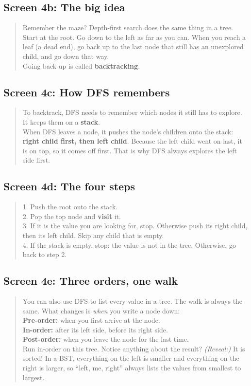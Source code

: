 \documentclass[11pt,a4paper]{article}
\begin{document}
\subsection*{Screen 4b: The big idea}
\begin{quote}\sffamily\small
Remember the maze? Depth-first search does the same thing in a tree.\\
Start at the root. Go down to the left as far as you can. When you reach a leaf (a dead end),
go back up to the last node that still has an unexplored child, and go down that way.\\[2pt]
Going back up is called \textbf{backtracking}.
\end{quote}

\subsection*{Screen 4c: How DFS remembers}
\begin{quote}\sffamily\small
To backtrack, DFS needs to remember which nodes it still has to explore. It keeps them on a
\textbf{stack}.\\
When DFS leaves a node, it pushes the node's children onto the stack: \textbf{right child first,
then left child}. Because the left child went on last, it is on top, so it comes off first. That is
why DFS always explores the left side first.
\end{quote}

\subsection*{Screen 4d: The four steps}
\begin{quote}\sffamily\small
1. Push the root onto the stack.\\
2. Pop the top node and \textbf{visit} it.\\
3. If it is the value you are looking for, stop. Otherwise push its right child, then its left
child. Skip any child that is empty.\\
4. If the stack is empty, stop: the value is not in the tree. Otherwise, go back to step 2.
\end{quote}

\subsection*{Screen 4e: Three orders, one walk}
\begin{quote}\sffamily\small
You can also use DFS to list every value in a tree. The walk is always the same. What changes is
\emph{when} you write a node down:\\
\textbf{Pre-order:} when you first arrive at the node.\\
\textbf{In-order:} after its left side, before its right side.\\
\textbf{Post-order:} when you leave the node for the last time.\\[2pt]
Run in-order on this tree. Notice anything about the result? \emph{(Reveal:)} It is sorted! In a BST,
everything on the left is smaller and everything on the right is larger, so ``left, me, right''
always lists the values from smallest to largest.
\end{quote}
\end{document}
